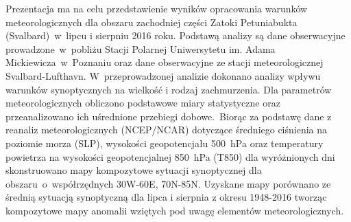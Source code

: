 \documentclass[\main/boa.tex]{subfiles}
\begin{document}
Prezentacja ma na celu przedstawienie wyników opracowania warunków meteorologicznych dla obszaru zachodniej części Zatoki Petuniabukta (Svalbard)~w~lipcu 
i sierpniu 2016 roku. Podstawą analizy są dane obserwacyjne prowadzone~w~pobliżu Stacji Polarnej Uniwersytetu im. Adama Mickiewicza~w~Poznaniu oraz dane obserwacyjne ze stacji meteorologicznej Svalbard-Lufthavn. W~przeprowadzonej analizie dokonano analizy wpływu warunków synoptycznych na wielkość i rodzaj zachmurzenia. Dla parametrów meteorologicznych obliczono podstawowe miary statystyczne oraz przeanalizowano ich uśrednione przebiegi dobowe. Biorąc za podstawę dane z reanaliz meteorologicznych (NCEP/NCAR) dotyczące średniego ciśnienia na poziomie morza (SLP), wysokości geopotencjału 500~hPa oraz temperatury powietrza na wysokości geopotencjalnej 850~hPa (T850) dla wyróżnionych dni skonstruowano mapy kompozytowe sytuacji synoptycznej dla obszaru~o~współrzędnych 30W-60E, 70N-85N. Uzyskane mapy porównano ze średnią sytuacją synoptyczną dla lipca i sierpnia z okresu 1948-2016 tworząc kompozytowe mapy anomalii wziętych pod uwagę elementów meteorologicznych.
\end{document}
